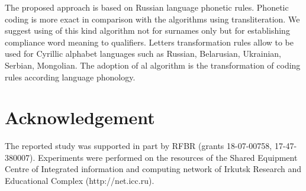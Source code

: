 \documentclass[conference,a4paper]{IEEEtran}
\begin{document}
The proposed approach is based on Russian language phonetic rules. Phonetic coding is more exact in comparison with the algorithms using transliteration. We suggest using of this kind algorithm not for surnames only but for establishing compliance word meaning to qualifiers. Letters transformation rules allow to be used for Cyrillic alphabet languages such as Russian, Belarusian, Ukrainian, Serbian, Mongolian. The adoption of al algorithm is the transformation of coding rules according language phonology.



\section*{Acknowledgement}
The reported study was supported in part by RFBR (grants 18-07-00758, 17-47-380007). Experiments were performed on the resources of the Shared Equipment Centre of Integrated information and computing network of Irkutsk Research and Educational Complex (http://net.icc.ru).






\end{document}
